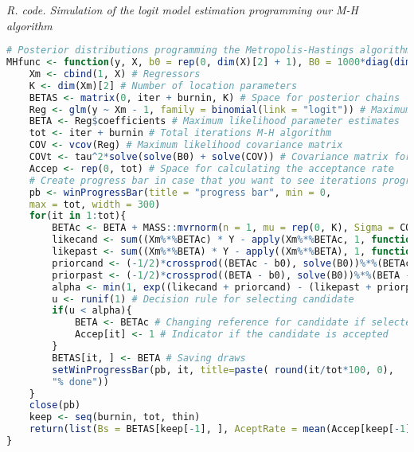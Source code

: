 \begin{tcolorbox}[enhanced,width=4.67in,center upper,
	fontupper=\large\bfseries,drop shadow southwest,sharp corners]
	\textit{R. code. Simulation of the logit model estimation programming our M-H algorithm}
	\begin{VF}
		\begin{lstlisting}[language=R]		
# Posterior distributions programming the Metropolis-Hastings algorithm
MHfunc <- function(y, X, b0 = rep(0, dim(X)[2] + 1), B0 = 1000*diag(dim(X)[2] + 1), tau = 1, iter = 6000, burnin = 1000, thin = 5){
	Xm <- cbind(1, X) # Regressors
	K <- dim(Xm)[2] # Number of location parameters
	BETAS <- matrix(0, iter + burnin, K) # Space for posterior chains
	Reg <- glm(y ~ Xm - 1, family = binomial(link = "logit")) # Maximum likelihood estimation
	BETA <- Reg$coefficients # Maximum likelihood parameter estimates 
	tot <- iter + burnin # Total iterations M-H algorithm
	COV <- vcov(Reg) # Maximum likelihood covariance matrix
	COVt <- tau^2*solve(solve(B0) + solve(COV)) # Covariance matrix for the proposal distribution
	Accep <- rep(0, tot) # Space for calculating the acceptance rate
	# Create progress bar in case that you want to see iterations progress
	pb <- winProgressBar(title = "progress bar", min = 0,
	max = tot, width = 300)
	for(it in 1:tot){
		BETAc <- BETA + MASS::mvrnorm(n = 1, mu = rep(0, K), Sigma = COVt) # Candidate location parameter
		likecand <- sum((Xm%*%BETAc) * Y - apply(Xm%*%BETAc, 1, function(x) log(1 + exp(x)))) # Log likelihood for the candidate
		likepast <- sum((Xm%*%BETA) * Y - apply((Xm%*%BETA), 1, function(x) log(1 + exp(x)))) # Log likelihood for the actual draw
		priorcand <- (-1/2)*crossprod((BETAc - b0), solve(B0))%*%(BETAc - b0) # Log prior for candidate
		priorpast <- (-1/2)*crossprod((BETA - b0), solve(B0))%*%(BETA - b0) # Log prior for actual draw
		alpha <- min(1, exp((likecand + priorcand) - (likepast + priorpast))) #Probability of selecting candidate
		u <- runif(1) # Decision rule for selecting candidate
		if(u < alpha){
			BETA <- BETAc # Changing reference for candidate if selected
			Accep[it] <- 1 # Indicator if the candidate is accepted
		} 
		BETAS[it, ] <- BETA # Saving draws
		setWinProgressBar(pb, it, title=paste( round(it/tot*100, 0),
		"% done"))
	}
	close(pb)
	keep <- seq(burnin, tot, thin)
	return(list(Bs = BETAS[keep[-1], ], AceptRate = mean(Accep[keep[-1]])))
}
\end{lstlisting}
	\end{VF}
\end{tcolorbox} 

